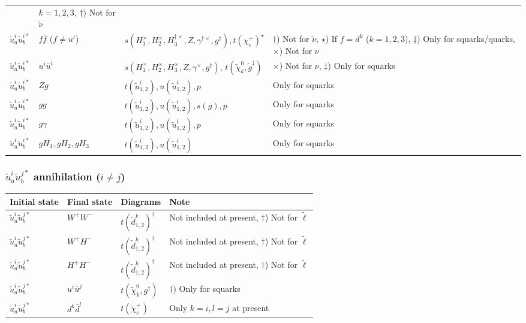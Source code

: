 {\begin{center}
\begin{tabular}{llll}
& \parbox[t]{4cm}{$k=1,2,3$, $\dagger$) Not for $\tilde{\nu}$} \\
$\tilde{u}^i_a\tilde{u}^{i*}_b$ & $f \bar{f}$ ($f \ne u^i$) &
$s(H_{1}^\times,H_{2}^\times,H_3^{\dagger\times},Z,\gamma^{\dagger\times},g^\ddagger), t({\chi^+_c})^\star$
& \parbox[t]{4cm}{$\dagger$) Not for $\tilde{\nu}$, $\star$) If $f=d^k$ ($k=1,2,3$), $\ddagger$) Only for squarks/quarks, $\times$) Not for $\nu$} \\
$\tilde{u}^i_a\tilde{u}^{i*}_b$ & $u^i \bar{u}^i$ &
$s(H_{1}^\times,H_{2}^\times,H_3^{\times},Z,\gamma^{\times}, g^\ddagger)$, $t(\tilde{\chi}_{k}^0,\tilde{g}^\ddagger)$
& \parbox[t]{4cm}{$\times$) Not for $\nu$,
$\ddagger$) Only for squarks}  \\ 
$\tilde{u}^i_a\tilde{u}^{i*}_b$ & $Z g$ & $t(\tilde{u}^i_{1,2}), u(\tilde{u}^i_{1,2}), p$
& Only for squarks\\
$\tilde{u}^i_a\tilde{u}^{i*}_b$ & $g g$ & $t(\tilde{u}^i_{1,2}), u(\tilde{u}^i_{1,2}), s(g), p$
& Only for squarks\\
$\tilde{u}^i_a\tilde{u}^{i*}_b$ & $g \gamma$ & $t(\tilde{u}^i_{1,2}), u(\tilde{u}^i_{1,2}), p$
& Only for squarks\\
$\tilde{u}^i_a\tilde{u}^{i*}_b$ & $g H_1, g H_2, g H_3$ & 
$t(\tilde{u}^i_{1,2}), u(\tilde{u}^i_{1,2})$
& Only for squarks\\ \hline
\end{tabular}
\end{center}
}

\subsubsection{$\tilde{u}^i_a\tilde{u}^{j*}_b$ annihilation ($i \ne j$)}

\begin{center}
\begin{tabular}{llll} \hline
{\bfseries Initial state} & {\bfseries Final state} &
{\bfseries Diagrams} & {\bfseries Note} \\ \hline \tabspace
$\tilde{u}^i_a\tilde{u}^{j*}_b$ & $W^+W^-$ &
$t(\tilde{d}^k_{1,2})^\dagger$
& Not included at present, $\dagger$) Not for $\tilde{\ell}$ \\
$\tilde{u}^i_a\tilde{u}^{j*}_b$ & $W^+ H^-$ &
$t(\tilde{d}^k_{1,2})^\dagger$
& Not included at present, $\dagger$) Not for $\tilde{\ell}$ \\
$\tilde{u}^i_a\tilde{u}^{j*}_b$ & $H^+ H^-$ &
$t(\tilde{d}^k_{1,2})^\dagger$
& Not included at present, $\dagger$) Not for $\tilde{\ell}$ \\
$\tilde{u}^i_a \tilde{u}^{j*}_b$ & $u^i \bar{u}^j$ &
$t(\tilde{\chi}_{k}^0,g^\dagger)$
& $\dagger$) Only for squarks \\
$\tilde{u}^i_a \tilde{u}^{j*}_b$ & $d^k \bar{d}^l$ &
$t(\tilde{\chi}_{c}^+)$
& Only $k=i,l=j$ at present \\ \hline
\end{tabular}
\end{center}

